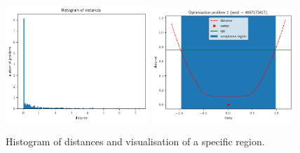 \begin{figure}[h]
    \begin{center}
      \includegraphics[width=0.48\textwidth]{./Thesis/images/chapter3/example_theta_dist.png}
      \includegraphics[width=0.48\textwidth]{./Thesis/images/chapter3/example_region.png}
    \end{center}
  \caption{Histogram of distances and visualisation of a specific region.}
  \label{fig:example_training}
\end{figure}
